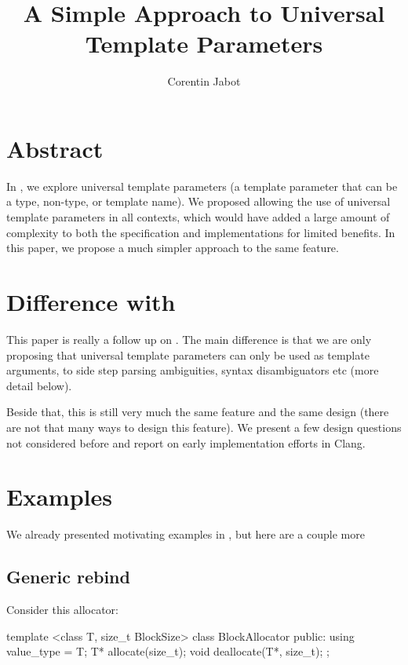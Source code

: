 \documentclass{wg21}
\title{A Simple Approach to Universal Template Parameters}
\author{Corentin Jabot}{corentin.jabot@gmail.com}
\begin{document}
\maketitle

\section{Abstract}
In , we explore universal template parameters (a template parameter that can be a type, non-type, or template name).
We proposed allowing the use of universal template parameters in all contexts, which would have added a large amount of complexity to both the specification and implementations
for limited benefits. In this paper, we propose a much simpler approach to the same feature.

\section{Difference with }

This paper is really a follow up on .
The main difference is that we are only proposing that universal template parameters can only be used as template arguments, to side step parsing ambiguities, syntax disambiguators etc
(more detail below).

Beside that, this is still very much the same feature and the same design (there are not that many ways to design this feature).
We present a few design questions not considered before and report on early implementation efforts in Clang.


\section{Examples}

We already presented motivating examples in , but here are a couple more

\subsection{Generic rebind}

Consider this allocator:

\begin{colorblock}
template <class T, size_t BlockSize>
class BlockAllocator {
    public:
    using value_type = T;
    T* allocate(size_t);
    void deallocate(T*, size_t);
};
\end{colorblock}
\end{document}

